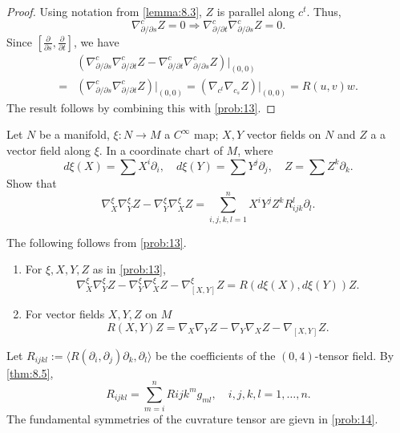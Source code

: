 \begin{proof}
Using notation from \autoref{lemma:8.3}, $Z$ is parallel along $c^t$. Thus,
\[
\nabla_{\partial/\partial s}^cZ = 0 \Rightarrow \nabla_{\partial/\partial t}^c\nabla_{\partial/\partial s}^cZ = 0.
\]
Since $\left[\frac{\partial}{\partial s}, \frac{\partial}{\partial t}\right]$, we have
\[
\begin{aligned}
&\left(\nabla_{\partial/\partial s}^c\nabla_{\partial/\partial t}^cZ - \nabla_{\partial/\partial t}^c\nabla_{\partial/\partial s}^cZ\right)\Big|_{(0,0)} \\
= &\left(\nabla_{\partial/\partial s}^c\nabla_{\partial/\partial t}^cZ \right)\Big|_{(0,0)} = (\nabla_{c^t}\nabla_{c_s}Z)|_{(0,0)} = R(u,v)w.
\end{aligned}
\]
The result follows by combining this with \autoref{prob:13}.
\end{proof}

\begin{problem}\label{prob:13}
Let $N$ be a manifold, $\xi : N\to M$ a $C^{\infty}$ map; $X,Y$ vector fields on $N$ and $Z$ a a vector field along $\xi$. 
In a coordinate chart of $M$, where
\[
d\xi(X) = \sum X^i\partial_i, \quad d\xi(Y) = \sum Y^j\partial_j, \quad Z = \sum Z^k\partial_k.
\]
Show that
\[
\nabla_X^{\xi}\nabla_Y^{\xi}Z - \nabla_Y^{\xi}\nabla_X^{\xi}Z = \sum_{i,j,k,l=1}^n X^iY^jZ^kR_{ijk}^l\partial_l.
\]
\end{problem}

The following follows from \autoref{prob:13}.

\begin{corollary}\label{cor:8.6}
\begin{enumerate}[label=(\arabic*), ref=Corollary \thecorollary~(\arabic*)]
\item \label{cor:8.6.1} For $\xi, X, Y, Z$ as in \autoref{prob:13},
\[
\nabla_X^{\xi}\nabla_Y^{\xi}Z - \nabla_Y^{\xi}\nabla_X^{\xi}Z - \nabla_{[X,Y]}^{\xi}Z = R(d\xi(X),d\xi(Y))Z.
\]
\item \label{cor:8.6.2} For vector fields $X,Y,Z$ on $M$
\[
R(X,Y)Z = \nabla_X\nabla_YZ - \nabla_Y\nabla_XZ - \nabla_{[X,Y]}Z.
\]
\end{enumerate}
Let $R_{ijkl} := \langle R(\partial_i,\partial_j)\partial_k, \partial_l\rangle$ be the coefficients of the $(0,4)$-tensor field.
By \autoref{thm:8.5},
\[
R_{ijkl} = \sum_{m=i}^nR{ijk}^mg_{ml}, \quad i,j,k,l=1,\dots,n.
\]
The fundamental symmetries of the cuvrature tensor are gievn in \autoref{prob:14}.
\end{corollary}

